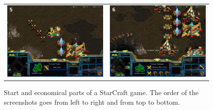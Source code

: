 \begin{figure}[!ht]
\begin{center}
\begin{tabular}{cc}
\includegraphics[width=0.48\columnwidth]{images/SC_game/SC_upgrade_attack.png} & 
\includegraphics[width=0.48\columnwidth]{images/SC_game/SC_queue_production.png}
\end{tabular}
\caption{Start and economical parts of a StarCraft game. The order of the screenshots goes from left to right and from top to bottom.}
\label{fig:SC_game1}
\end{center}
\end{figure}

